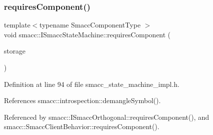 \subsubsection{\texorpdfstring{requires\+Component()}{requiresComponent()}}
{\footnotesize\ttfamily template$<$typename Smacc\+Component\+Type $>$ \\
void smacc\+::\+I\+Smacc\+State\+Machine\+::requires\+Component (\begin{DoxyParamCaption}\item[{Smacc\+Component\+Type $\ast$\&}]{storage }\end{DoxyParamCaption})}



Definition at line 94 of file smacc\+\_\+state\+\_\+machine\+\_\+impl.\+h.



References smacc\+::introspection\+::demangle\+Symbol().



Referenced by smacc\+::\+I\+Smacc\+Orthogonal\+::requires\+Component(), and smacc\+::\+Smacc\+Client\+Behavior\+::requires\+Component().


